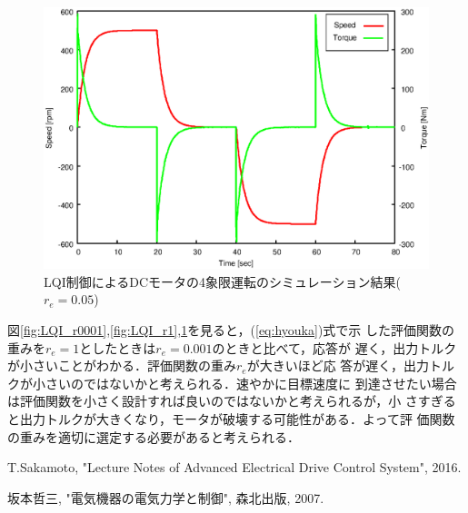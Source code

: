 \documentclass[a4paper,12pt]{jarticle}
\begin{document}
%
%
\begin{figure}[htbp]
 \begin{center}
  \includegraphics[width = 150mm]{fig/LQI_r005.eps}
 \end{center}
 \caption{LQI制御によるDCモータの4象限運転のシミュレーション結果($r_e=0.05$)}
 \label{fig:LQI_r005}
\end{figure}
%
%
図\ref{fig:LQI_r0001},\ref{fig:LQI_r1},\ref{fig:LQI_r005}を見ると，(\ref{eq:hyouka})式で示
した評価関数の重みを$r_e=1$としたときは$r_e=0.001$のときと比べて，応答が
遅く，出力トルクが小さいことがわかる．評価関数の重み$r_e$が大きいほど応
答が遅く，出力トルクが小さいのではないかと考えられる．速やかに目標速度に
到達させたい場合は評価関数を小さく設計すれば良いのではないかと考えられるが，小
さすぎると出力トルクが大きくなり，モータが破壊する可能性がある．よって評
価関数の重みを適切に選定する必要があると考えられる．

 
%
%
%

%
\begin{thebibliography}{99}

  T.Sakamoto,
		 "Lecture Notes of Advanced Electrical Drive Control System", 2016.

  坂本哲三, "電気機器の電気力学と制御", 森北出版, 2007.

\end{thebibliography}
\end{document}
